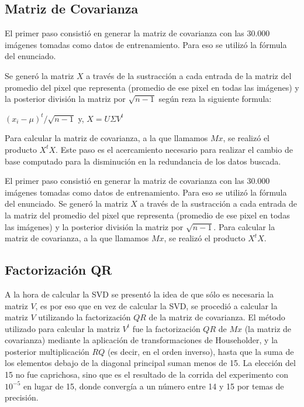 \subsection{Matriz de Covarianza}

El primer paso consisti\'o en generar la matriz de covarianza con las 30.000
im\'agenes tomadas como datos de entrenamiento. Para eso se utiliz\'o la f\'ormula del enunciado.

Se gener\'o la matriz $X$ a trav\'es de la sustracci\'on a cada entrada de la
matriz del promedio del pixel que representa (promedio de ese pixel en todas las
im\'agenes) y la posterior divisi\'on la matriz por $\sqrt{n-1}$ seg\'un reza la
siguiente formula:
\\

\centerline{$(x_i - \mu)^{t}/\sqrt{n-1}$ y, $X=U \Sigma V^t$}
\bigskip
Para calcular la matriz de covarianza, a la que llamamos $Mx$, se realiz\'o el
producto $X^tX$. Este paso es el acercamiento necesario para realizar el cambio
de base computado para la disminuci\'on en la redundancia de los datos buscada.

El primer paso consisti\'o en generar la matriz de covarianza con las 30.000
im\'agenes tomadas como datos de entrenamiento. Para eso se utiliz\'o la f\'ormula del enunciado.
Se gener\'o la matriz $X$ a trav\'es de la sustracci\'on a cada entrada de la
matriz del promedio del pixel que representa (promedio de ese pixel en todas las im\'agenes)
y la posterior divisi\'on la matriz por $\sqrt{n-1}$. Para calcular la
matriz de covarianza, a la que llamamos $Mx$, se realiz\'o el producto $X^tX$.

\subsection{Factorizaci\'on QR}
A la hora de calcular la SVD se present\'o la idea de que s\'olo es necesaria la matriz $V$, es por
eso que en vez de calcular la SVD, se procedi\'o a calcular la matriz $V$ utilizando la factorizaci\'on
$QR$ de la matriz de covarianza. El m\'etodo utilizado para calcular la matriz $V^t$ fue la factorizaci\'on
$QR$ de $Mx$ (la matriz de covarianza) mediante la aplicaci\'on de transformaciones de Householder, y la
posterior multiplicaci\'on $RQ$ (es decir, en el orden inverso), hasta que la suma de los elementos debajo
de la diagonal principal suman menos de 15. La elecci\'on del 15 no fue caprichosa, sino que es el
resultado de la corrida del experimento con $10^{-5}$ en lugar de 15, donde converg\'ia a un n\'umero
entre 14 y 15 por temas de precisi\'on.

